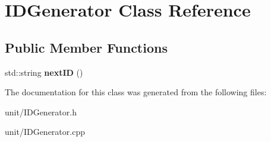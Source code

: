 \hypertarget{classIDGenerator}{}\section{I\+D\+Generator Class Reference}
\label{classIDGenerator}
\subsection*{Public Member Functions}
\begin{DoxyCompactItemize}
\item 
std\+::string {\bfseries next\+ID} ()\hypertarget{classIDGenerator_a223bf057a0ad9e69df527142dfe1e91b}{}\label{classIDGenerator_a223bf057a0ad9e69df527142dfe1e91b}

\end{DoxyCompactItemize}


The documentation for this class was generated from the following files\+:\begin{DoxyCompactItemize}
\item 
unit/I\+D\+Generator.\+h\item 
unit/I\+D\+Generator.\+cpp\end{DoxyCompactItemize}
